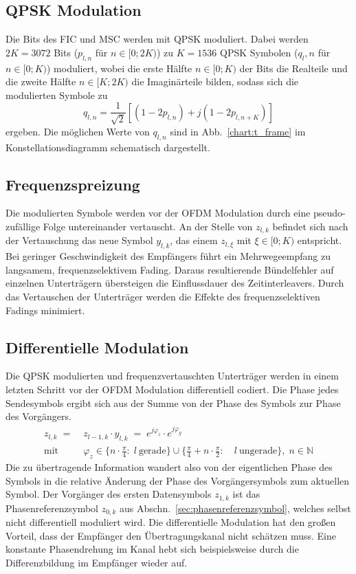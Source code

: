\subsection{QPSK Modulation}
\label{sec:qpsk}
Die Bits des FIC und MSC werden mit QPSK moduliert. Dabei werden $2K=3072$ Bits ($p_{l,n}$ für $n\in[0;2K)$) zu $K=1536$ QPSK Symbolen ($q_l,n$ für $n\in[0;K)$) moduliert, wobei die erste Hälfte $n\in [0;K)$ der Bits die Realteile und die zweite Hälfte $n\in [K;2K)$ die Imaginärteile bilden, sodass sich die modulierten Symbole zu
\begin{equation}
q_{l,n} = \frac{1}{\sqrt{2}}\left[\left(1-2p_{l,n}\right)+j\left(1-2p_{l,n+K}\right)\right]
\end{equation}
ergeben. Die möglichen Werte von $q_{l,n}$ sind in Abb.~\ref{chart:t_frame} im Konstellationsdiagramm schematisch dargestellt.

\subsection{Frequenzspreizung}
Die modulierten Symbole werden vor der OFDM Modulation durch eine pseudo-zufällige Folge untereinander vertauscht. An der Stelle von $z_{l,k}$ befindet sich nach der Vertauschung das neue Symbol $y_{l,k}$, das einem $z_{l,\xi}$ mit $\xi \in [0;K)$ entspricht. Bei geringer Geschwindigkeit des Empfängers führt ein Mehrwegeempfang zu langsamem, frequenzselektivem Fading. Daraus resultierende Bündelfehler auf einzelnen Unterträgern übersteigen die Einflussdauer des Zeitinterleavers. Durch das Vertauschen der Unterträger werden die Effekte des frequenzselektiven Fadings minimiert.


\subsection{Differentielle Modulation}
\label{sec:diff_mod}
Die QPSK modulierten und frequenzvertauschten Unterträger werden in einem letzten Schritt vor der OFDM Modulation differentiell codiert. Die Phase jedes Sendesymbols ergibt sich aus der Summe von der Phase des Symbols zur Phase des Vorgängers.
\begin{equation}
\begin{aligned}
z_{l,k}\; =\; &z_{l-1,k}\cdot y_{l,k}\; =\; e^{j\varphi_z} \cdot e^{j\varphi_y} \\
\text{mit} \; \; &\varphi_z \in \{n \cdot \frac{\pi}{4}: \; l \: \text{gerade}\} \cup \{\frac{\pi}{4} + n \cdot \frac{\pi}{2}: \quad l \: \text{ungerade}\}, \; n\in \mathbb{N} 
\end{aligned}
\end{equation}
Die zu übertragende Information wandert also von der eigentlichen Phase des Symbols in die relative Änderung der Phase des Vorgängersymbols zum aktuellen Symbol. Der Vorgänger des ersten Datensymbols $z_{1,k}$ ist das Phasenreferenzsymbol $z_{0,k}$ aus Abschn.~\ref{sec:phasenreferenzsymbol}, welches selbst nicht differentiell moduliert wird. Die differentielle Modulation hat den großen Vorteil, dass der Empfänger den Übertragungskanal nicht schätzen muss. Eine konstante Phasendrehung im Kanal hebt sich beispielsweise durch die Differenzbildung im Empfänger wieder auf.


